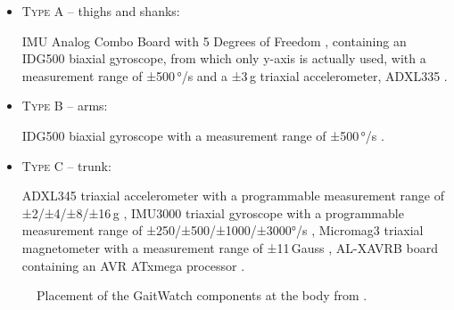 \begin{itemize}

\item \textsc{Type A} -- thighs and shanks: 

IMU Analog Combo Board with 5 Degrees of Freedom \cite{IMU5}, containing an IDG500 biaxial gyroscope, from which only y-axis is actually used, with a measurement range of ±500\,°/s \cite{IDG500} and a ±3\,g triaxial accelerometer, ADXL335 \cite{ADXL335}.

\item \textsc{Type B} -- arms:

IDG500 biaxial gyroscope with a measurement range of ±500\,°/s \cite{IDG500}.

\item \textsc{Type C} -- trunk:

ADXL345 triaxial accelerometer with a programmable measurement range of ±2/±4/±8/±16\,g \cite{ADXL345},
IMU3000 triaxial gyroscope with a programmable measurement range of ±250/±500/±1000/±3000°/s \cite{IMU3000}, 
Micromag3 \allowbreak triaxial magnetometer with a measurement range of ±11\,Gauss \cite{MicroMag3}, AL-XAVRB board containing an AVR ATxmega processor \cite{AVRATxmega}.

\end{itemize}

\begin{figure}
	\centering
	\caption{Placement of the GaitWatch components at the body from \cite{olivares_vicente_gaitwatch_2013}.}
	\label{fig:GaitWatch_placement}
\end{figure}

